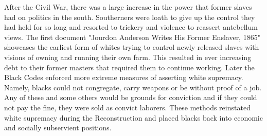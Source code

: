 After the Civil War, there was a large increase in the power that former slaves had on politics in the south.
Southerners were loath to give up the control they had held for so long and resorted to trickery and violence to reassert antebellum views.
The first document "Jourdon Anderson Writes His Former Enslaver, 1865" showcases the earliest form of whites trying to control newly released slaves with visions of owning and running their own farm.
This resulted in ever increasing debt to their former masters that required them to continue working.
Later the Black Codes enforced more extreme measures of asserting white supremacy.
Namely, blacks could not congregate, carry weapons or be without proof of a job.
Any of these and some others would be grounds for conviction and if they could not pay the fine, they were sold as convict laborers.
These methods reinstated white supremacy during the Reconstruction and placed blacks back into economic and socially subservient positions.